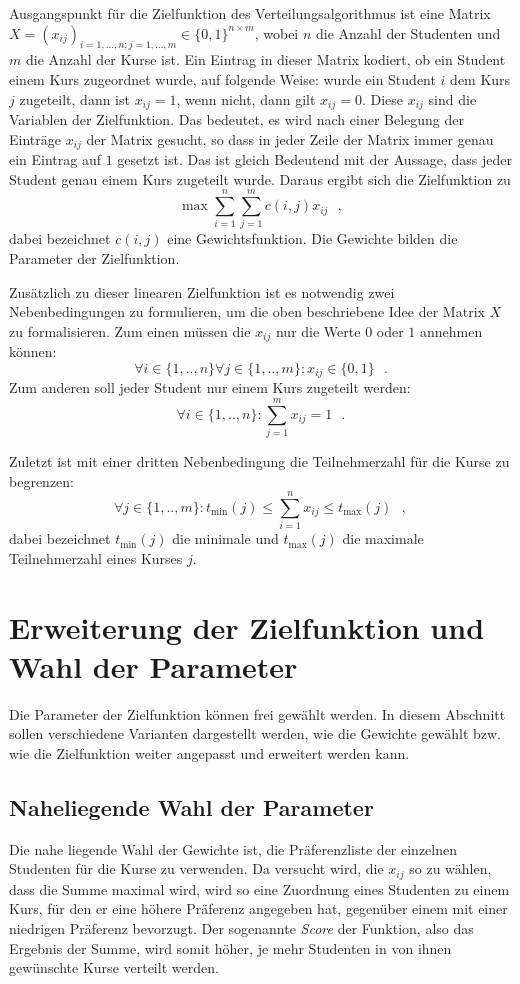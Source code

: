         Ausgangspunkt für die Zielfunktion des Verteilungsalgorithmus ist eine Matrix $ X = (x_{ij})_{i=1,...,n;j=1,...,m} \in \{0,1\}^{n \times m}$, wobei $ n $ die Anzahl der Studenten und $ m $ die Anzahl der Kurse ist.
        Ein Eintrag in dieser Matrix kodiert, ob ein Student einem Kurs zugeordnet wurde, auf folgende Weise:
        wurde ein Student $ i $ dem Kurs $ j $ zugeteilt, dann ist $ x_{ij} = 1 $, wenn nicht, dann gilt $ x_{ij} = 0 $. 
        Diese $ x_{ij} $ sind die Variablen der Zielfunktion.
        Das bedeutet, es wird nach einer Belegung der Einträge $ x_{ij} $ der Matrix gesucht, so dass in jeder Zeile der Matrix immer genau ein Eintrag auf $ 1 $ gesetzt ist.
        Das ist gleich Bedeutend mit der Aussage, dass jeder Student genau einem Kurs zugeteilt wurde.
        Daraus ergibt sich die Zielfunktion zu
            $$ \max \sum_{i=1}^{n} \sum_{j=1}^{m} c(i,j)x_{ij}  ~~~,$$
        dabei bezeichnet $ c(i,j) $ eine Gewichtsfunktion.
        Die Gewichte bilden die Parameter der Zielfunktion.
        
        Zusätzlich zu dieser linearen Zielfunktion ist es notwendig zwei Nebenbedingungen zu formulieren, um die oben beschriebene Idee der Matrix $ X $ zu formalisieren.
        Zum einen müssen die $ x_{ij} $ nur die Werte $ 0 $ oder $ 1 $ annehmen können:
            $$\forall {i \in \{1,..,n\}} \forall {j \in \{1,..,m\}}:  x_{ij} \in \{0,1\} ~~~.$$
        Zum anderen soll jeder Student nur einem Kurs zugeteilt werden:
            $$ \forall {i \in \{1,..,n\}}: \sum_{j=1}^{m} x_{ij} = 1 ~~~.$$
        
        Zuletzt ist mit einer dritten Nebenbedingung die Teilnehmerzahl für die Kurse zu begrenzen:
             $$ \forall {j \in \{1,..,m\}}: t_{\min}(j) \leq \sum_{i=1}^{n} x_{ij} \leq t_{\max}(j) ~~~,$$
        dabei bezeichnet $ t_{\min}(j) $ die minimale und $ t_{\max}(j) $ die maximale Teilnehmerzahl eines Kurses $ j $.
        
    \section{Erweiterung der Zielfunktion und Wahl der Parameter}
        Die Parameter der Zielfunktion können frei gewählt werden.
        In diesem Abschnitt sollen verschiedene Varianten dargestellt werden, wie die Gewichte gewählt bzw. wie die Zielfunktion weiter angepasst und erweitert werden kann.
        
        \subsection{Naheliegende Wahl der Parameter}
            Die nahe liegende Wahl der Gewichte ist, die Präferenzliste der einzelnen Studenten für die Kurse zu verwenden.
            Da versucht wird, die $ x_{ij} $ so zu wählen, dass die Summe maximal wird, wird so eine Zuordnung eines Studenten zu einem Kurs, für den er eine höhere Präferenz angegeben hat, gegenüber einem mit einer niedrigen Präferenz bevorzugt.
            Der sogenannte \textit{Score} der Funktion, also das Ergebnis der Summe, wird somit höher, je mehr Studenten in von ihnen gewünschte Kurse verteilt werden.
            
